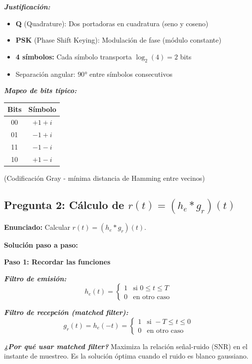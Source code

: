 \documentclass[11pt,a4paper]{article}
\begin{document}
\textit{\textbf{Justificación:}}
\begin{itemize}
    \item \textbf{Q} (Quadrature): Dos portadoras en cuadratura (seno y coseno)
    \item \textbf{PSK} (Phase Shift Keying): Modulación de fase (módulo constante)
    \item \textbf{4 símbolos:} Cada símbolo transporta $\log_2(4) = 2$ bits
    \item Separación angular: $90°$ entre símbolos consecutivos
\end{itemize}

\textit{\textbf{Mapeo de bits típico:}}
\begin{center}
\begin{tabular}{|c|c|}
\hline
\textbf{Bits} & \textbf{Símbolo} \\
\hline
00 & $+1+i$ \\
01 & $-1+i$ \\
11 & $-1-i$ \\
10 & $+1-i$ \\
\hline
\end{tabular}
\end{center}

(Codificación Gray - mínima distancia de Hamming entre vecinos)

\subsection*{Pregunta 2: C\'alculo de $r(t) = (h_e * g_r)(t)$}

\textbf{Enunciado:} Calcular $r(t) = (h_e * g_r)(t)$.

\vspace{0.3cm}
\textbf{Soluci\'on paso a paso:}

\textbf{Paso 1: Recordar las funciones}

\textit{\textbf{Filtro de emisi\'on:}}
\[
h_e(t) = \begin{cases}
1 & \text{si } 0 \leq t \leq T \\
0 & \text{en otro caso}
\end{cases}
\]

\textit{\textbf{Filtro de recepci\'on (matched filter):}}
\[
g_r(t) = h_e(-t) = \begin{cases}
1 & \text{si } -T \leq t \leq 0 \\
0 & \text{en otro caso}
\end{cases}
\]

\textit{\textbf{¿Por qu\'e usar matched filter?}} Maximiza la relaci\'on se\~nal-ruido (SNR) en el instante de muestreo. Es la soluci\'on \'optima cuando el ruido es blanco gaussiano.
\end{document}
